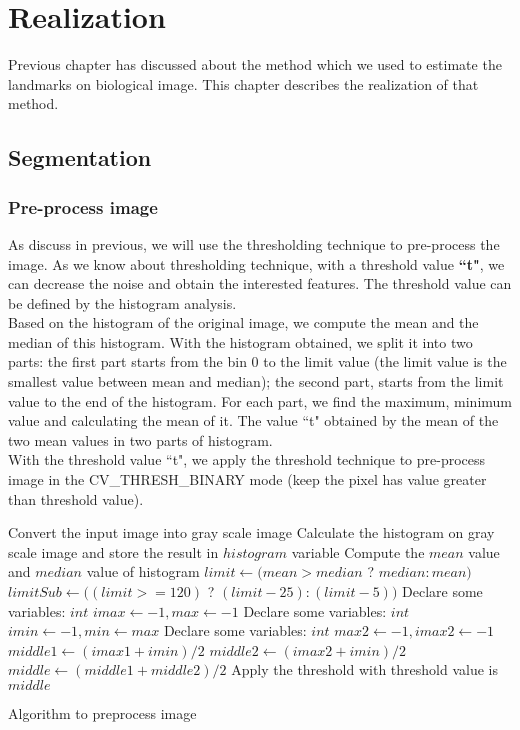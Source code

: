 \chapter{Realization}
Previous chapter has discussed about the method which we used to estimate the landmarks on biological image. This chapter describes the realization of that method.
\section{Segmentation}
\subsection{Pre-process image}
As discuss in previous, we will use the thresholding technique to pre-process the image. As we know about thresholding technique, with a threshold value \textbf{``t"}, we can decrease the noise and obtain the interested features. The threshold value can be defined by the histogram analysis.\\[0.2cm]
Based on the histogram of the original image, we compute the mean and the median of this histogram. With the histogram obtained, we split it into two parts: the first part starts from the bin 0 to the limit value (the limit value is the smallest value between mean and median); the second part, starts from the limit value to the end of the histogram. For each part, we find the maximum, minimum value and calculating the mean of it. The value ``t" obtained by the mean of the two mean values in two parts of histogram.\\
With the threshold value ``t", we apply the threshold technique to pre-process image in the CV\_THRESH\_BINARY mode (keep the pixel has value greater than threshold value).\\
\IncMargin{1em}
\begin{algorithm}[H]
\SetAlgoLined
\Indm 
{}
\Indp
Convert the input image into gray scale image\;
Calculate the histogram on gray scale image and store the result in $histogram$ variable \;
Compute the $mean$ value and $median$ value of histogram\;
$limit \leftarrow (mean > median$ ? $median : mean)$\;
$limitSub \leftarrow ((limit >= 120)$ ? $(limit - 25) : (limit - 5))$\;
Declare some variables: $int$ $imax \leftarrow -1, max \leftarrow -1$\;
Declare some variables: $int$ $imin \leftarrow -1, min \leftarrow max$\;
Declare some variables: $int$ $max2 \leftarrow -1, imax2 \leftarrow -1$\;
$middle1 \leftarrow (imax1 + imin)/2$ \;
$middle2 \leftarrow (imax2 + imin)/2$ \;
$middle \leftarrow (middle1 + middle2)/2$ \;
Apply the threshold with threshold value is $middle$\;
\caption{Algorithm to preprocess image}
\end{algorithm}\DecMargin{1em}

